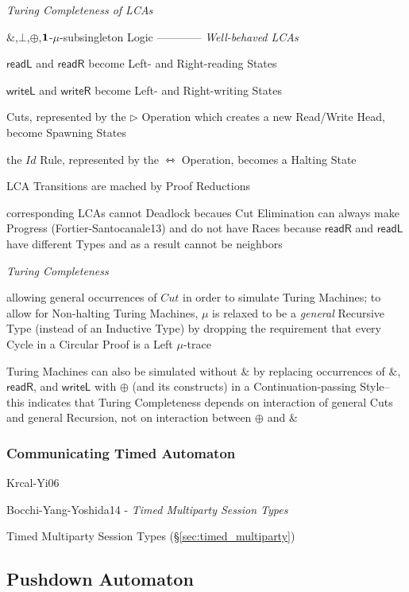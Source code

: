 \emph{Turing Completeness of LCAs}

$\&$,$\bot$,$\oplus$,$\mathbf{1}$-$\mu$-subsingleton Logic ------------
\emph{Well-behaved LCAs}

$\mathsf{readL}$ and $\mathsf{readR}$ become Left- and Right-reading
States

$\mathsf{writeL}$ and $\mathsf{writeR}$ become Left- and Right-writing
States

Cuts, represented by the $\rhd$ Operation which creates a new
Read/Write Head, become Spawning States

the $Id$ Rule, represented by the $\leftrightarrowtriangle$ Operation,
becomes a Halting State

LCA Transitions are mached by Proof Reductions

corresponding LCAs cannot Deadlock becaues Cut Elimination can always
make Progress (Fortier-Santocanale13) and do not have Races because
$\mathsf{readR}$ and $\mathsf{readL}$ have different Types and as a
result cannot be neighbors


\emph{Turing Completeness}

allowing general occurrences of $Cut$ in order to simulate Turing Machines; to
allow for Non-halting Turing Machines, $\mu$ is relaxed to be a \emph{general}
Recursive Type (instead of an Inductive Type) by dropping the requirement that
every Cycle in a Circular Proof is a Left $\mu$-trace

Turing Machines can also be simulated without $\&$ by replacing occurrences of
$\&$, $\mathsf{readR}$, and $\mathsf{writeL}$ with $\oplus$ (and its constructs)
in a Continuation-passing Style-- this indicates that Turing Completeness
depends on interaction of general Cuts and general Recursion, not on interaction
between $\oplus$ and $\&$



\subsubsection{Communicating Timed Automaton}\label{sec:communicating_timed_fsm}

Krcal-Yi06

Bocchi-Yang-Yoshida14 - \emph{Timed Multiparty Session Types}

Timed Multiparty Session Types (\S\ref{sec:timed_multiparty})



\subsection{Pushdown Automaton}\label{sec:pushdown_automaton}


